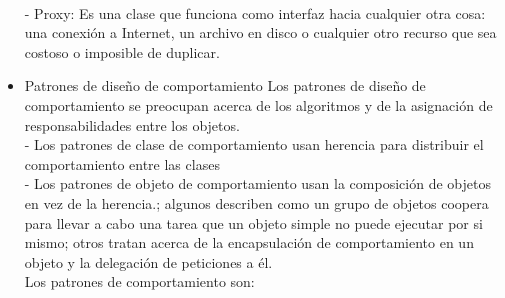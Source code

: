 \documentclass[twoside,twocolumn]{article}
\begin{document}
\begin{itemize}
\\- Proxy: Es una clase que funciona como interfaz hacia cualquier otra cosa: una conexión a Internet, un archivo en disco o cualquier otro recurso que sea costoso o imposible de duplicar.
	\item Patrones de diseño de comportamiento
	Los patrones de diseño de comportamiento se
preocupan acerca de los algoritmos y de la asignación
de responsabilidades entre los objetos.
	\\- Los patrones de clase de comportamiento usan herencia para distribuir el comportamiento entre las
clases
	\\- Los patrones de objeto de comportamiento usan la composición de objetos en vez de la herencia.; algunos
describen como un grupo de objetos coopera para
llevar a cabo una tarea que un objeto simple no puede ejecutar por si mismo; otros tratan acerca de la encapsulación de comportamiento en un objeto y la delegación de peticiones a él.\\
Los patrones de comportamiento son:


\end{itemize}
\end{document}
